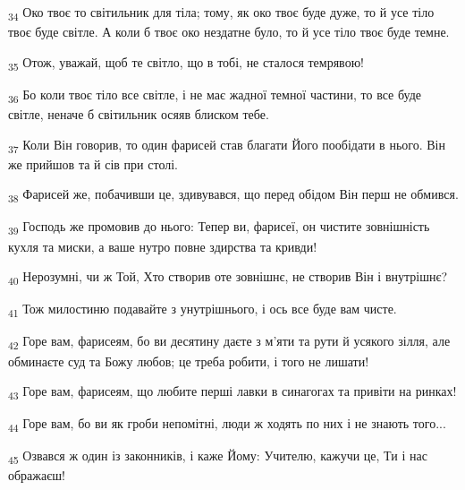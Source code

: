 \begin{tcolorbox}
\textsubscript{34} Око твоє то світильник для тіла; тому, як око твоє буде дуже, то й усе тіло твоє буде світле. А коли б твоє око нездатне було, то й усе тіло твоє буде темне.
\end{tcolorbox}
\begin{tcolorbox}
\textsubscript{35} Отож, уважай, щоб те світло, що в тобі, не сталося темрявою!
\end{tcolorbox}
\begin{tcolorbox}
\textsubscript{36} Бо коли твоє тіло все світле, і не має жадної темної частини, то все буде світле, неначе б світильник осяяв блиском тебе.
\end{tcolorbox}
\begin{tcolorbox}
\textsubscript{37} Коли Він говорив, то один фарисей став благати Його пообідати в нього. Він же прийшов та й сів при столі.
\end{tcolorbox}
\begin{tcolorbox}
\textsubscript{38} Фарисей же, побачивши це, здивувався, що перед обідом Він перш не обмився.
\end{tcolorbox}
\begin{tcolorbox}
\textsubscript{39} Господь же промовив до нього: Тепер ви, фарисеї, он чистите зовнішність кухля та миски, а ваше нутро повне здирства та кривди!
\end{tcolorbox}
\begin{tcolorbox}
\textsubscript{40} Нерозумні, чи ж Той, Хто створив оте зовнішнє, не створив Він і внутрішнє?
\end{tcolorbox}
\begin{tcolorbox}
\textsubscript{41} Тож милостиню подавайте з унутрішнього, і ось все буде вам чисте.
\end{tcolorbox}
\begin{tcolorbox}
\textsubscript{42} Горе вам, фарисеям, бо ви десятину даєте з м'яти та рути й усякого зілля, але обминаєте суд та Божу любов; це треба робити, і того не лишати!
\end{tcolorbox}
\begin{tcolorbox}
\textsubscript{43} Горе вам, фарисеям, що любите перші лавки в синагогах та привіти на ринках!
\end{tcolorbox}
\begin{tcolorbox}
\textsubscript{44} Горе вам, бо ви як гроби непомітні, люди ж ходять по них і не знають того...
\end{tcolorbox}
\begin{tcolorbox}
\textsubscript{45} Озвався ж один із законників, і каже Йому: Учителю, кажучи це, Ти і нас ображаєш!
\end{tcolorbox}
